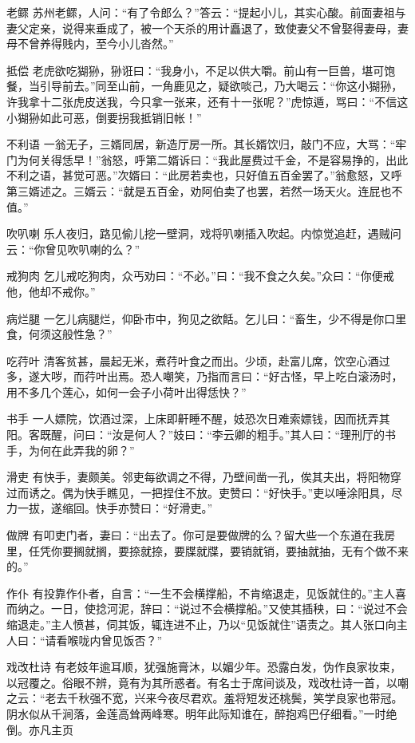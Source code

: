 \documentclass[12pt,UTF8]{ctexbook}
\begin{document}
老鳏
苏州老鳏，人问：“有了令郎么？”答云：“提起小儿，其实心酸。前面妻祖与妻父定亲，说得来垂成了，被一个天杀的用计矗退了，致使妻父不曾娶得妻母，妻母不曾养得贱内，至今小儿沓然。”

抵偿
老虎欲吃猢狲，狲诳曰：“我身小，不足以供大嚼。前山有一巨兽，堪可饱餐，当引导前去。”同至山前，一角鹿见之，疑欲啖己，乃大喝云：“你这小猢狲，许我拿十二张虎皮送我，今只拿一张来，还有十一张呢？”虎惊遁，骂曰：“不信这小猢狲如此可恶，倒要拐我抵销旧帐！”

不利语
一翁无子，三婿同居，新造厅房一所。其长婿饮归，敲门不应，大骂：“牢门为何关得恁早！”翁怒，呼第二婿诉曰：“我此屋费过千金，不是容易挣的，出此不利之语，甚觉可恶。”次婿曰：“此房若卖也，只好值五百金罢了。”翁愈怒，又呼第三婿述之。三婿云：“就是五百金，劝阿伯卖了也罢，若然一场天火。连屁也不值。”

吹叭喇
乐人夜归，路见偷儿挖一壁洞，戏将叭喇插入吹起。内惊觉追赶，遇贼问云：“你曾见吹叭喇的么？”

戒狗肉
乞儿戒吃狗肉，众丐劝曰：“不必。”曰：“我不食之久矣。”众曰：“你便戒他，他却不戒你。”

病烂腿
一乞儿病腿烂，仰卧市中，狗见之欲餂。乞儿曰：“畜生，少不得是你口里食，何须这般性急？”

吃荇叶
清客贫甚，晨起无米，煮荇叶食之而出。少顷，赴富儿席，饮空心酒过多，遂大哕，而荇叶出焉。恐人嘲笑，乃指而言曰：“好古怪，早上吃白滚汤时，用不多几个莲心，如何一会子小荷叶出得恁快？”

书手
一人嫖院，饮酒过深，上床即鼾睡不醒，妓恐次日难索嫖钱，因而抚弄其阳。客既醒，问曰：“汝是何人？”妓曰：“李云卿的粗手。”其人曰：“理刑厅的书手，为何在此弄我的卵？”

滑吏
有快手，妻颇美。邻吏每欲调之不得，乃壁间凿一孔，俟其夫出，将阳物穿过而诱之。偶为快手瞧见，一把捏住不放。吏赞曰：“好快手。”吏以唾涂阳具，尽力一拔，遂缩回。快手亦赞曰：“好滑吏。”

做牌
有叩吏门者，妻曰：“出去了。你可是要做牌的么？留大些一个东道在我房里，任凭你要搁就搁，要捺就捺，要牒就牒，要销就销，要抽就抽，无有个做不来的。”

作仆
有投靠作仆者，自言：“一生不会横撑船，不肯缩退走，见饭就住的。”主人喜而纳之。一日，使捻河泥，辞曰：“说过不会横撑船。”又使其插秧，曰：“说过不会缩退走。”主人愤甚，伺其饭，辄连进不止，乃以“见饭就住”语责之。其人张口向主人曰：“请看喉咙内曾见饭否？”

戏改杜诗
有老妓年逾耳顺，犹强施膏沐，以媚少年。恐露白发，伪作良家妆束，以冠覆之。俗眼不辨，竟有为其所惑者。有名士于席间谈及，戏改杜诗一首，以嘲之云：“老去千秋强不宽，兴来今夜尽君欢。羞将短发还桃鬓，笑学良家也带冠。阴水似从千涧落，金莲高耸两峰寒。明年此际知谁在，醉抱鸡巴仔细看。”一时绝倒。亦凡主页
\end{document}
